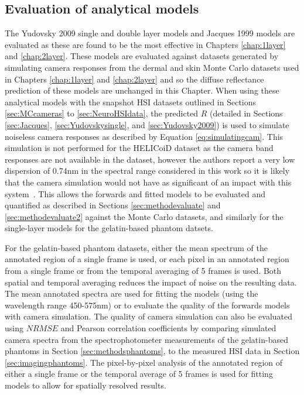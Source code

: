 \subsection{Evaluation of analytical models}
The Yudovsky 2009 single and double layer models and Jacques 1999 models are evaluated as these are found to be the most effective in Chapters \ref{chap:1layer} and \ref{chap:2layer}. These models are evaluated against datasets generated by simulating camera responses from the dermal and skin Monte Carlo datasets used in Chapters \ref{chap:1layer} and \ref{chap:2layer} and so the diffuse reflectance prediction of these models are unchanged in this Chapter. When using these analytical models with the snapshot HSI datasets outlined in Sections \ref{sec:MCcameras} to \ref{sec:NeuroHSIdata}, the predicted $R$ (detailed in Sections \ref{sec:Jacques}, \ref{sec:Yudovskysingle}, and \ref{sec:Yudovsky2009}) is used to simulate noiseless camera responses as described by Equation \eqref{eq:simulatingcam}. This simulation is not performed for the HELICoiD dataset as the camera band responses are not available in the dataset, however the authors report a very low dispersion of 0.74nm in the spectral range considered in this work so it is likely that the camera simulation would not have as significant of an impact with this system~\citep{Fabelo2018}. This allows the forwards and fitted models to be evaluated and quantified as described in Sections \ref{sec:methodevaluate} and \ref{sec:methodevaluate2} against the Monte Carlo datasets, and similarly for the single-layer models for the gelatin-based phantom datsets. 

For the gelatin-based phantom datasets, either the mean spectrum of the annotated region of a single frame is used, or each pixel in an annotated region from a single frame or from the temporal averaging of 5 frames is used. Both spatial and temporal averaging reduces the impact of noise on the resulting data. The mean annotated spectra are used for fitting the models (using the wavelength range 450-575nm) or to evaluate the quality of the forwards models with camera simulation. The quality of camera simulation can also be evaluated using $NRMSE$ and Pearson correlation coefficients by comparing simulated camera spectra from the spectrophotometer measurements of the gelatin-based phantoms in Section \ref{sec:methodsphantoms}, to the measured HSI data in Section \ref{sec:imagingphantoms}. The pixel-by-pixel analysis of the annotated region of either a single frame or the temporal average of 5 frames is used for fitting models to allow for spatially resolved results.


